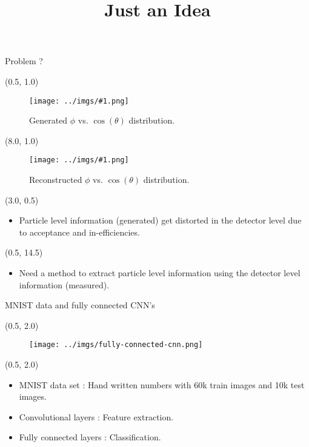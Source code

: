 \documentclass[10pt, xcolor={dvipsnames}, aspectratio = 169, sans,mathserif]{beamer}
\title{Just an Idea}
\newcommand{\leftpic}[2]
{
\begin{textblock}{7.0}(0.5, 1.0)
\begin{figure}
    \centering
    \texttt{[image: ../imgs/\#1.png]}
    \caption{#2}
\end{figure}
\end{textblock}
}
\newcommand{\rightpic}[2]
{
\begin{textblock}{7.0}(8.0, 1.0)
\begin{figure}
    \centering
    \texttt{[image: ../imgs/\#1.png]}
    \caption{#2}
\end{figure}
\end{textblock}
}
\begin{document}
\begin{frame}
    \maketitle
\end{frame}

\begin{frame}[fragile]{Problem ?}

\leftpic{phi_costh_mc}{Generated $\phi$ vs. $\cos(\theta)$ distribution.}

\rightpic{phi_costh}{Reconstructed $\phi$ vs. $\cos(\theta)$ distribution.}

\begin{textblock}{13.0}(3.0, 0.5)
\begin{itemize}
    \item Particle level information (generated) get distorted in the detector level due to acceptance and in-efficiencies.
\end{itemize}
\end{textblock}

\begin{textblock}{15.0}(0.5, 14.5)
\begin{itemize}
    \item Need a method to extract particle level information using the detector level information (measured).
\end{itemize}
\end{textblock}

\end{frame}

\begin{frame}{MNIST data and fully connected CNN's}

\begin{textblock}{14.0}(0.5, 2.0)
\begin{figure}
    \centering
    \texttt{[image: ../imgs/fully-connected-cnn.png]}
\end{figure}
\end{textblock}

\begin{textblock}{10.0}(0.5, 2.0)
\begin{itemize}

    \item MNIST data set : Hand written numbers with 60k train images and 10k test images.

    \item Convolutional layers : Feature extraction.

    \item Fully connected layers : Classification.
\end{itemize}
\end{textblock}

\end{frame}
\end{document}
